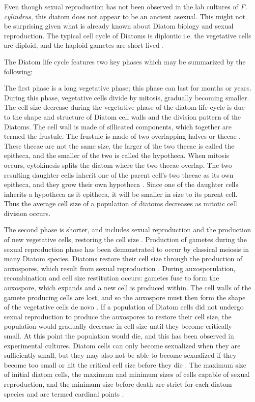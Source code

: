 Even though sexual reproduction has not been observed in the lab cultures of \textit{F. cylindrus}, this diatom does not appear to be an ancient asexual.
This might not be surprising given what is already known about Diatom biology and sexual reproduction.
The typical cell cycle of Diatoms is diplontic i.e. the vegetative cells are diploid, and the haploid gametes are short lived \parencite{Chepurnov2004}.

The Diatom life cycle features two key phases which may be summarized by the following:

The first phase is a long vegetative phase; this phase can last for months or years. During this phase, vegetative cells divide by mitosis, gradually becoming smaller. 
The cell size decrease during the vegetative phase of the diatom life cycle is due to the shape and structure of Diatom cell walls and the division pattern of the Diatoms. 
The cell wall is made of sillicated components, which together are termed the frustule. The frustule is made of two overlapping halves or thecae \parencite{Chepurnov2004,Davidovich1998,Poulickova2008}.
These thecae are not the same size, the larger of the two thecae is called the epitheca, and the smaller of the two is called the hypotheca.
When mitosis occurs, cytokinesis splits the diatom where the two thecae overlap.
The two resulting daughter cells inherit one of the parent cell’s two thecae as its own epitheca, and they grow their own hypotheca \parencite{Chepurnov2004}.
Since one of the daughter cells inherits a hypotheca as it epitheca, it will be smaller in size to its parent cell.
Thus the average cell size of a population of diatoms decreases as mitotic cell division occurs.

The second phase is shorter, and includes sexual reproduction and the production of new vegetative cells, restoring the cell size \parencite{Chepurnov2004}.
Production of gametes during the sexual reproduction phase has been demonstrated to occur by classical meiosis in many Diatom species.
Diatoms restore their cell size through the production of auxospores, which result from sexual reproduction \parencite{Davidovich1998}.
During auxosporulation, recombination and cell size restitution occurs: gametes fuse to form the auxospore, which expands and a new cell is produced within.
The cell walls of the gamete producing cells are lost, and so the auxospore must then form the shape of the vegetative cells de novo \parencite{Chepurnov2004}.
If a population of Diatom cells did not undergo sexual reproduction to produce the auxospores to restore their cell size, the population would gradually decrease in cell size until they become critically small.
At this point the population would die, and this has been observed in experimental cultures.
Diatom cells can only become sexualized when they are sufficiently small, but they may also not be able to become sexualized if they become too small or hit the critical cell size before they die \parencite{Chepurnov2004,Davidovich1998,Poulickova2008}.
The maximum size of initial diatom cells, the maximum and minimum sizes of cells capable of sexual reproduction, and the minimum size before death are strict for each diatom species and are termed cardinal points \parencite{Chepurnov2004}.

